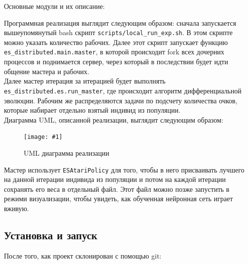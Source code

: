 \documentclass[12pt]{article}
\newcommand{\img}[2]{
    \begin{figure}[H]
        \centering
        \texttt{[image: \#1]}
        \caption{#2}
    \end{figure}
}
\begin{document}
    Основные модули и их описание:

    Программная реализация выглядит следующим образом: сначала запускается вышеупомянутый bash скрипт \verb!scripts/local_run_exp.sh!. В этом скрипте можно указать количество рабочих. Далее этот скрипт запускает функцию \verb!es_distributed.main.master!, в которой происходит fork всех дочерних процессов и поднимается сервер, через который в последствии будет идти общение мастера и рабочих. \\

    Далее мастер итерация за итерацией будет выполнять \verb!es_distributed.es.run_master!, где происходит алгоритм дифференциальной эволюции. Рабочим же распределяются задачи по подсчету количества очков, которые набирает отдельно взятый индивид из популяции. \\

    Диаграмма UML, описанной реализации, выглядит следующим образом:
    \img{uml.png}{UML диаграмма реализации}

    Мастер использует \verb!ESAtariPolicy! для того, чтобы в него присваивать лучшего на данной итерации индивида из популяции и потом на каждой итерации сохранять его веса в отдельный файл. Этот файл можно позже запустить в режими визуализации, чтобы увидеть, как обученная нейронная сеть играет вживую.

    \subsection{Установка и запуск}
    После того, как проект склонирован с помощью git: \\
\end{document}
